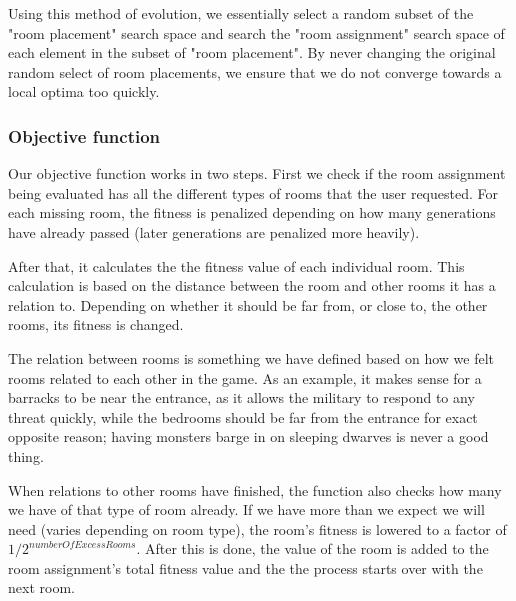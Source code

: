Using this method of evolution, we essentially select a random subset of the "room placement" search space and search the "room assignment" search space of each element in the subset of "room placement". By never changing the original random select of room placements, we ensure that we do not converge towards a local optima too quickly.

\subsubsection{Objective function}
Our objective function works in two steps. First we check if the room assignment being evaluated has all the different types of rooms that the user requested. For each missing room, the fitness is penalized depending on how many generations have already passed (later generations are penalized more heavily).

After that, it calculates the the fitness value of each individual room. This calculation is based on the distance between the room and other rooms it has a relation to. Depending on whether it should be far from, or close to, the other rooms, its fitness is changed. 

The relation between rooms is something we have defined based on how we felt rooms related to each other in the game. As an example, it makes sense for a barracks to be near the entrance, as it allows the military to respond to any threat quickly, while the bedrooms should be far from the entrance for exact opposite reason; having monsters barge in on sleeping dwarves is never a good thing.

When relations to other rooms have finished, the function also checks how many we have of that type of room already. If we have more than we expect we will need (varies depending on room type), the room's fitness is lowered to a factor of $1 / 2^{numberOfExcessRooms}$. After this is done, the value of the room is added to the room assignment's total fitness value and the the process starts over with the next room.

